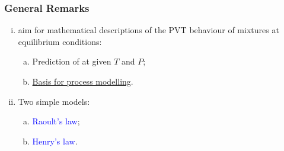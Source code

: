 \documentclass[10pt,compress,unknownkeysallowed]{beamer}
\begin{document}
\begin{frame}
  \frametitle{General Remarks}
  \begin{enumerate}[i)]
      \item<1->  aim for mathematical descriptions of the PVT behaviour of mixtures at equilibrium conditions:
         \begin{enumerate}[a)]
            \item<1-> Prediction of  at given $T$ and $P$;
            \item<1-> \underline{Basis for process modelling}.
         \end{enumerate}
      \item<2-> Two simple models:
         \begin{enumerate}[a)]
            \item<2-> \textcolor{blue}{Raoult's law};
            \item<2-> \textcolor{blue}{Henry's law}.
         \end{enumerate}
  \end{enumerate}
\end{frame}
\end{document}
